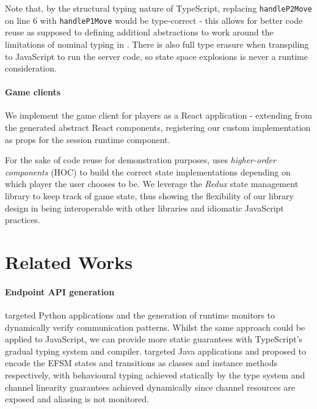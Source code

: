 \documentclass[submission,copyright,creativecommons]{eptcs}
\begin{document}
Note that, by the structural typing nature of TypeScript, replacing \texttt{handleP2Move} on line 6 with \texttt{handleP1Move} would be type-correct - this allows for better code reuse as supposed to defining additionl abstractions to work around the limitations of nominal typing in \cite{Hybrid2016}. There is also full type erasure when transpiling to JavaScript to run the server code, so state space explosions is never a runtime consideration.

\paragraph{Game clients} We implement the game client for players as a React application - extending from the generated abstract React components, registering our custom implementation as props for the session runtime component.

For the sake of code reuse for demonstration purposes, \cite{NoughtsAndCrosses} uses \textit{higher-order components} (HOC) to build the correct state implementations depending on which player the user chooses to be. We leverage the \textit{Redux} state management library to keep track of game state, thus showing the flexibility of our library design in being interoperable with other libraries and idiomatic JavaScript practices. 

\section{Related Works}

\paragraph{Endpoint API generation} \cite{Python2017} targeted Python applications and the generation of runtime monitors to dynamically verify communication patterns. Whilst the same approach could be applied to JavaScript, we can provide more static guarantees with TypeScript's gradual typing system and compiler. \cite{Hybrid2016} targeted Java applications and proposed to encode the EFSM states and transitions as classes and instance methods respectively, with behavioural typing achieved statically by the type system and channel linearity guarantees achieved dynamically since channel resources are exposed and aliasing is not monitored.
\end{document}
